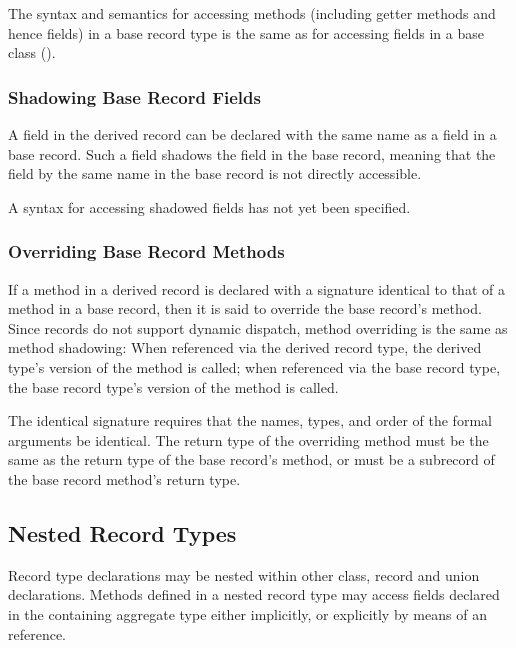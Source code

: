 The syntax and semantics for accessing methods (including getter methods and
hence fields) in a base
record type is the same as for accessing fields in a base class ().

\subsubsection{Shadowing Base Record Fields}
\label{Shadowing_Base_Record_Fields}

A field in the derived record can be declared with the same name as a
field in a base record.  Such a field shadows the field in the base
record, meaning that the field by the same name in the base record is not
directly accessible.

\begin{openissue}
A syntax for accessing shadowed fields has not yet been specified.
\end{openissue}

\subsubsection{Overriding Base Record Methods}
\label{Overriding_Base_Record_Methods}

If a method in a derived record is declared with a signature identical to that
of a method in a base record, then it is said to override the
base record's method.  Since records do not support dynamic dispatch, method
overriding is the same as method shadowing: When referenced via the derived
record type, the derived type's version of the method is called; when referenced
via the base record type, the base record type's version of the method is called.

The identical signature requires that the names, types, and order of
the formal arguments be identical. The return type of the overriding
method must be the same as the return type of the base record's method,
or must be a subrecord of the base record method's return type.

\subsection{Nested Record Types}
\label{Nested_Record_Types}

Record type declarations may be nested within other class, record and union
declarations.  Methods defined in a nested record type may access fields
declared in the containing aggregate type either implicitly, or explicitly by
means of an  reference.

